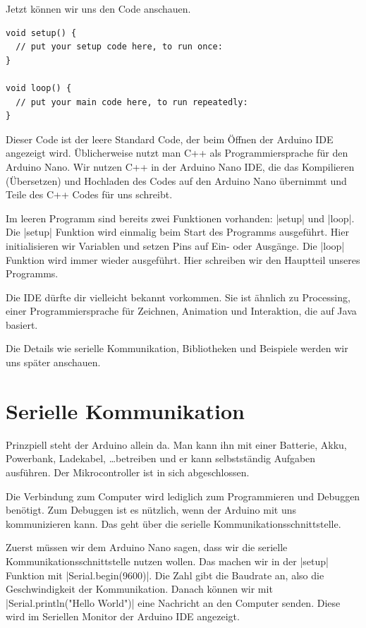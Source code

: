 \documentclass[a4paper,12pt]{book}
\begin{document}
Jetzt können wir uns den Code anschauen.

\begin{lstlisting}
void setup() {
  // put your setup code here, to run once:
}

void loop() {
  // put your main code here, to run repeatedly:
}
\end{lstlisting}

Dieser Code ist der leere Standard Code, der beim Öffnen der Arduino IDE angezeigt wird.
Üblicherweise nutzt man C++ als Programmiersprache für den Arduino Nano.
Wir nutzen C++ in der Arduino Nano IDE, die das Kompilieren (Übersetzen) und Hochladen des Codes auf den Arduino Nano übernimmt
und Teile des C++ Codes für uns schreibt.

Im leeren Programm sind bereits zwei Funktionen vorhanden: |setup| und |loop|.
Die |setup| Funktion wird einmalig beim Start des Programms ausgeführt.
Hier initialisieren wir Variablen und setzen Pins auf Ein- oder Ausgänge.
Die |loop| Funktion wird immer wieder ausgeführt.
Hier schreiben wir den Hauptteil unseres Programms.

Die IDE dürfte dir vielleicht bekannt vorkommen.
Sie ist ähnlich zu Processing, einer Programmiersprache für Zeichnen, Animation und Interaktion, 
die auf Java basiert.

Die Details wie serielle Kommunikation, Bibliotheken und Beispiele werden wir uns später anschauen.

\section*{Serielle Kommunikation}
Prinzpiell steht der Arduino allein da.
Man kann ihn mit einer Batterie, Akku, Powerbank, Ladekabel, \ldots betreiben
und er kann selbstständig Aufgaben ausführen.
Der Mikrocontroller ist in sich abgeschlossen.

Die Verbindung zum Computer wird lediglich zum Programmieren und Debuggen benötigt.
Zum Debuggen ist es nützlich, wenn der Arduino mit uns kommunizieren kann.
Das geht über die serielle Kommunikationsschnittstelle.



Zuerst müssen wir dem Arduino Nano sagen, dass wir die serielle Kommunikationsschnittstelle nutzen wollen.
Das machen wir in der |setup| Funktion mit |Serial.begin(9600)|.
Die Zahl gibt die Baudrate an, also die Geschwindigkeit der Kommunikation.
Danach können wir mit |Serial.println("Hello World")| eine Nachricht an den Computer senden.
Diese wird im Seriellen Monitor der Arduino IDE angezeigt.
\end{document}
